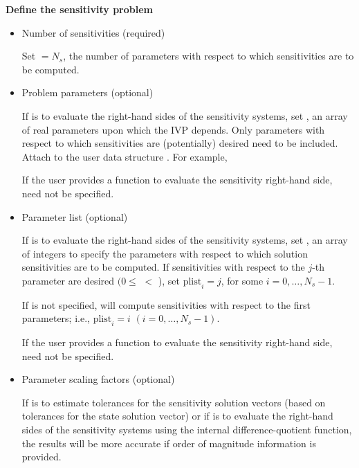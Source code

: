 \begin{Steps}
\item \label{i:fwd_start}
  {\bf Define the sensitivity problem}

  \begin{itemize}

    \item Number of sensitivities (required)

      Set  $= N_s$, the number of parameters with respect to which sensitivities
      are to be computed.
  
    \item Problem parameters (optional)

      If {\cvodes} is to evaluate the right-hand sides of the sensitivity 
      systems, set , an array of  real parameters upon which the IVP 
      depends. Only parameters with respect to which sensitivities are (potentially) 
      desired need to be included. 
      Attach  to the user data structure . 
      For example, 

      If the user provides a function to evaluate the sensitivity right-hand side,
       need not be specified.

    \item Parameter list (optional)

      If {\cvodes} is to evaluate the right-hand sides of the sensitivity 
      systems, set , an array of  integers to specify the 
      parameters  with respect to which solution sensitivities are to be computed.
      If sensitivities with respect to the $j$-th parameter  are desired
      $(0 \leq $  $ < $ ), set
      ${\text{plist}}_i = j$, for some $i = 0,\ldots,N_s-1$.

      If  is not specified, {\cvodes} will compute
      sensitivities with respect to the first  parameters;
      i.e., ${\text{plist}}_i = i$ $(i = 0,\ldots, N_s - 1)$.

      If the user provides a function to evaluate the sensitivity right-hand side,
       need not be specified.

    \item Parameter scaling factors (optional)

      If {\cvodes} is to estimate tolerances for the sensitivity solution vectors (based
      on tolerances for the state solution vector) or if {\cvodes} is to evaluate 
      the right-hand sides of the sensitivity systems using the internal difference-quotient
      function, the results will be more accurate if order of magnitude information is provided.


\end{itemize}
\end{Steps}
